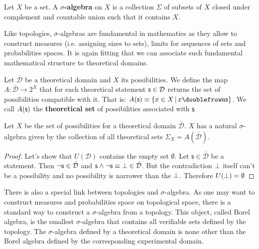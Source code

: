 \documentclass[11pt,letterpaper,fleqn]{memoir} %
\begin{document}
\begin{mathSection}
	\begin{defn}
		Let $X$ be a set. A \textbf{$\sigma$-algebra} on $X$ is a collection $\Sigma$ of subsets of $X$ closed under complement and countable union such that it contains $X$.
	\end{defn}
\end{mathSection}

Like topologies, $\sigma$-algebras are fundamental in mathematics as they allow to construct measures (i.e. assigning sizes to sets), limits for sequences of sets and probabilities spaces. It is again fitting that we can associate such fundamental mathematical structure to theoretical domains.

\begin{mathSection}
	
	\begin{defn}
		Let $\bar{\mathcal{D}}$ be a theoretical domain and $X$ its possibilities. We define the map $A : \bar{\mathcal{D}} \rightarrow 2^X$ that for each theoretical statement $\mathsf{s} \in \mathcal{D}$ returns the set of possibilities compatible with it. That is: $A(\stmt{s})\equiv\{ x \in X \, | \, x \comp \stmt{s}\}$. We call $A(\mathsf{s})$ the \textbf{theoretical set} of possibilities associated with $\mathsf{s}$
	\end{defn}
	
	\begin{prop}
		Let $X$ be the set of possibilities for a theoretical domain $\bar{\mathcal{D}}$. $X$ has a natural $\sigma$-algebra given by the collection of all theoretical sets $\Sigma_X=A(\bar{\mathcal{D}})$.
	\end{prop}
	
	\begin{proof}
		Let's show that $U(\mathcal{D})$ contains the empty set $\emptyset$. Let $\mathsf{s} \in \bar{\mathcal{D}}$ be a statement. Then $\neg\mathsf{s} \in \bar{\mathcal{D}}$ and $\mathsf{s} \wedge \neg\mathsf{s} \equiv \bot \in \bar{\mathcal{D}}$. But the contradiction $\bot$ itself can't be a possibility and no possibility is narrower than the $\bot$. Therefore $U(\bot) = \emptyset$
	\end{proof}
\end{mathSection}

There is also a special link between topologies and $\sigma$-algebra. As one may want to construct measures and probabilities space on topological space, there is a standard way to construct a $\sigma$-algebra from a topology. This object, called Borel algebra, is the smallest $\sigma$-algebra that contains all verifiable sets defined by the topology. The $\sigma$-algebra defined by a theoretical domain is none other than the Borel algebra defined by the corresponding experimental domain.
\end{document}
